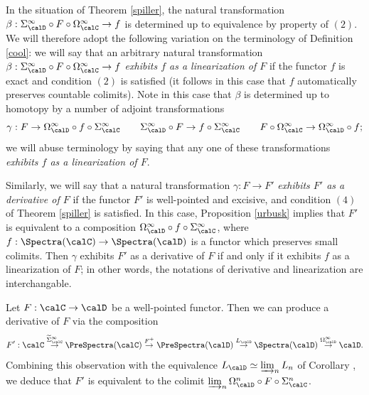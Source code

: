 \begin{remark}\label{rezza}
In the situation of Theorem \ref{spiller}, the natural transformation
$\beta: \Sigma^{\infty}_{\calD} \circ F \circ \Omega^{\infty}_{\calC} \rightarrow f$
is determined up to equivalence by property of $(2)$. We will therefore adopt
the following variation on the terminology of Definition \ref{cool}: we will say that
an arbitrary natural transformation $\beta: \Sigma^{\infty}_{\calD} \circ F \circ \Omega^{\infty}_{\calC} \rightarrow f$ {\it exhibits $f$ as a linearization of $F$} if the functor $f$ is exact and condition $(2)$ is
satisfied (it follows in this case that $f$ automatically preserves countable colimits).
Note in this case that $\beta$ is determined up to homotopy by a number of adjoint
transformations
$$ \gamma: F \rightarrow \Omega^{\infty}_{\calD} \circ f \circ \Sigma^{\infty}_{\calC} \quad \quad 
\Sigma^{\infty}_{\calD} \circ F \rightarrow f \circ \Sigma^{\infty}_{\calC} \quad \quad F \circ \Omega^{\infty}_{\calC} \rightarrow \Omega^{\infty}_{\calD} \circ f;$$
we will abuse terminology by saying that any one of these transformations
{\it exhibits $f$ as a linearization of $F$}.

Similarly, we will say that a natural transformation $\gamma: F \rightarrow F'$
{\it exhibits $F'$ as a derivative of $F$} if the functor $F'$ is well-pointed and excisive, and condition $(4)$ of Theorem \ref{spiller} is satisfied.
In this case, Proposition \ref{urbusk} implies that $F'$ is equivalent to a composition
$\Omega^{\infty}_{\calD} \circ f \circ \Sigma^{\infty}_{\calC}$, where
$f: \Spectra(\calC) \rightarrow \Spectra(\calD)$ is a functor which preserves small colimits.
Then $\gamma$ exhibits $F'$ as a derivative of $F$ if and only if
it exhibits $f$ as a linearization of $F$; in other words, the notations of derivative
and linearization are interchangable.
\end{remark}

\begin{remark}\label{derexi}
Let $F: \calC \rightarrow \calD$ be a well-pointed functor. Then we can produce a derivative
of $F$ via the composition
$$ F': \calC \stackrel{ \widetilde{ \Sigma}^{\infty}_{\calC} }{\rightarrow} 
\PreSpectra(\calC) \stackrel{F^{+}}{\rightarrow} \PreSpectra(\calD)
\stackrel{ L_{\calD}}{\rightarrow} \Spectra(\calD) \stackrel{ \Omega^{\infty}_{\calD} }{\rightarrow} \calD.$$
Combining this observation with the equivalence $L_{\calD} \simeq \varinjlim_{n} L_{n}$
of Corollary , we deduce that $F'$ is equivalent to the colimit
$\varinjlim_{n} \Omega^{n}_{\calD} \circ F \circ \Sigma^{n}_{\calC}$. 
\end{remark}

